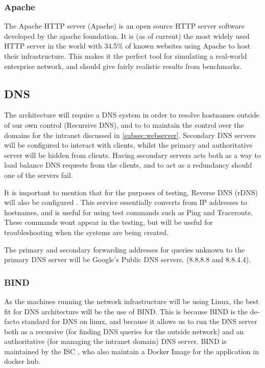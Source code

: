 \subsubsection{Apache}
\label{apacheserver}
The Apache HTTP server (Apache) is an open source HTTP server software developed by the apache foundation. It is (as of current) the most widely used HTTP server in the world with 34.5\% of known websites using Apache to host their infrastructure\citep{ApacheUsage}. This makes it the perfect tool for simulating a real-world enterprise network, and should give fairly realistic results from benchmarks.


\subsection{DNS}
The architecture will require a DNS system in order to resolve hostnames outside of our own control (Recursive DNS), and to to maintain the control over the domains for the intranet discussed in \ref{subsec:webserver}. Secondary DNS servers will be configured to interact with clients, whilst the primary and authoritative server will be hidden from clients. Having secondary servers acts both as a way to load balance DNS requests from the clients, and to act as a redundancy should one of the servers fail.

It is important to mention that for the purposes of testing, Reverse DNS (rDNS) will also be configured \citep{rfc1035}. This service essentially converts from IP addresses to hostnames, and is useful for using test commands such as Ping and Traceroute. These commands wont appear in the testing, but will be useful for troubleshooting when the systems are being created.

The primary and secondary forwarding addresses for queries unknown to the primary DNS server will be Google's Public DNS servers. (8.8.8.8 and 8.8.4.4).

\subsubsection{BIND}
As the machines running the network infrastructure will be using Linux, the best fit for DNS architecture will be the use of BIND. This is because BIND is the de-facto standard for DNS on linux, and because it allows us to run the DNS server both as a recursive (for finding DNS queries for the outside network) and an authoritative (for managing the intranet domain) DNS server. BIND is maintained by the ISC \citep{ISCtimeline}, who also maintain a Docker Image for the application in docker hub.

